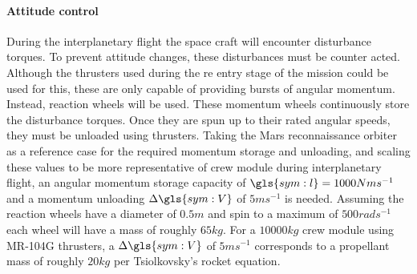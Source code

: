 \paragraph{Attitude control}
During the interplanetary flight the space craft will encounter disturbance torques. To prevent attitude changes, these disturbances must be counter acted. Although the thrusters used during the re entry stage of the mission could be used for this, these are only capable of providing bursts of angular momentum. Instead, reaction wheels will be used. These momentum wheels continuously store the disturbance torques. Once they are spun up to their rated angular speeds, they must be unloaded using thrusters. Taking the Mars reconnaissance orbiter \cite{You2007} as a reference case for the required momentum storage and unloading, and scaling these values to be more representative of crew module during interplanetary flight, an angular momentum storage capacity of $\gls{sym:l} = 1000 Nms^{-1} $ and a momentum unloading $\Delta \gls{sym:V}$ of $5 ms^{-1}$ is needed. Assuming the reaction wheels have a diameter of $0.5 m$ and spin to a maximum of $500 rads^{-1}$ each wheel will have a mass of roughly $65 kg$. For a $10000kg$ crew module using MR-104G thrusters, a $\Delta \gls{sym:V}$ of $5 ms^{-1}$ corresponds to a propellant mass of roughly $20kg$ per Tsiolkovsky's rocket equation. 
